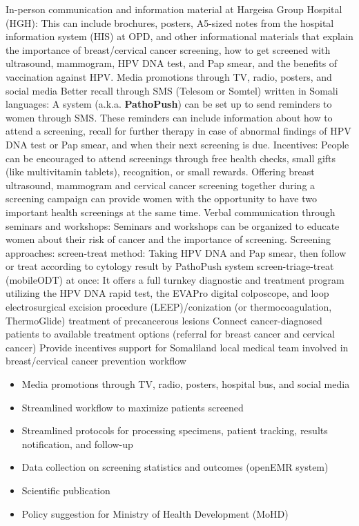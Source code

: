 \documentclass{article}
\begin{document}
\begin{itemize}
\begin{outline} 
\1 In-person communication and information material at Hargeisa Group Hospital (HGH): This can include brochures, posters, A5-sized notes from the hospital information system (HIS) at OPD, and other informational materials that explain the importance of breast/cervical cancer screening, how to get screened with ultrasound, mammogram, HPV DNA test, and Pap smear, and the benefits of vaccination against HPV. 
\1 Media promotions through TV, radio, posters, and social media
\1 Better recall through SMS (Telesom or Somtel) written in Somali languages: A system (a.k.a. \textbf{PathoPush}) can be set up to send reminders to women through SMS. These reminders can include information about how to attend a screening, recall for further therapy in case of abnormal findings of HPV DNA test or Pap smear, and when their next screening is due.
\1 Incentives: People can be encouraged to attend screenings through free health checks, small gifts (like multivitamin tablets), recognition, or small rewards. 
\1 Offering breast ultrasound, mammogram and cervical cancer screening together during a screening campaign can provide women with the opportunity to have two important health screenings at the same time. 
\1 Verbal communication through seminars and workshops: Seminars and workshops can be organized to educate women about their risk of cancer and the importance of screening. 
\1 Screening approaches:
    \2 screen-treat method: Taking HPV DNA and Pap smear, then follow or treat according to cytology result by PathoPush system
    \2 screen-triage-treat (mobileODT) at once: It offers a full turnkey diagnostic and treatment program utilizing the HPV DNA rapid test, the EVAPro digital colposcope, and loop electrosurgical excision procedure (LEEP)/conization (or thermocoagulation, ThermoGlide) treatment of precancerous lesions
\1 Connect cancer-diagnosed patients to available treatment options (referral for breast cancer and cervical cancer)
\1 Provide incentives support for Somaliland local medical team involved in breast/cervical cancer prevention workflow
\end{outline}

%
\begin{itemize}
\item Media promotions through TV, radio, posters, hospital bus, and social media
\item Streamlined workflow to maximize patients screened
\item Streamlined protocols for processing specimens, patient tracking, results notification, and follow-up
\item Data collection on screening statistics and outcomes (openEMR system)
\item Scientific publication
\item Policy suggestion for Ministry of Health Development (MoHD)
\end{itemize}

\end{itemize}
\end{document}
